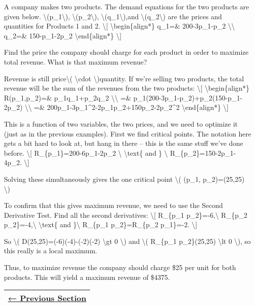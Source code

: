 A company makes two products. The demand equations for the two products
are given below. \textbackslash{}(p\_1\textbackslash{}),
\textbackslash{}(p\_2\textbackslash{}),
\textbackslash{}(q\_1\textbackslash{}),and
\textbackslash{}(q\_2\textbackslash{}) are the prices and quantities for
Products 1 and 2. \textbackslash{}{[} \textbackslash{}begin\{align*\}
q\_1=\& 200-3p\_1-p\_2 \textbackslash{}\textbackslash{} q\_2=\&
150-p\_1-2p\_2 \textbackslash{}end\{align*\} \textbackslash{}{]}

Find the price the company should charge for each product in order to
maximize total revenue. What is that maximum revenue?

Revenue is still price\textbackslash{}( \textbackslash{}cdot
\textbackslash{})quantity. If we're selling two products, the total
revenue will be the sum of the revenues from the two products:
\textbackslash{}{[} \textbackslash{}begin\{align*\} R(p\_1,p\_2)=\&
p\_1q\_1+p\_2q\_2 \textbackslash{}\textbackslash{} =\&
p\_1(200-3p\_1-p\_2)+p\_2(150-p\_1-2p\_2)
\textbackslash{}\textbackslash{} =\&
200p\_1-3p\_1\^{}2-2p\_1p\_2+150p\_2-2p\_2\^{}2
\textbackslash{}end\{align*\} \textbackslash{}{]}

This is a function of two variables, the two prices, and we need to
optimize it (just as in the previous examples). First we find critical
points. The notation here gets a bit hard to look at, but hang in there
-- this is the same stuff we've done before. \textbackslash{}{[}
R\_\{p\_1\}=200-6p\_1-2p\_2 \textbackslash{} \textbackslash{}text\{ and
\} \textbackslash{} R\_\{p\_2\}=150-2p\_1-4p\_2. \textbackslash{}{]}

Solving these simultaneously gives the one critical point
\textbackslash{}( (p\_1, p\_2)=(25,25) \textbackslash{})

To confirm that this gives maximum revenue, we need to use the Second
Derivative Test. Find all the second derivatives: \textbackslash{}{[}
R\_\{p\_1 p\_2\}=-6,\textbackslash{} R\_\{p\_2
p\_2\}=-4,\textbackslash{} \textbackslash{}text\{ and \}\textbackslash{}
R\_\{p\_1 p\_2\}=R\_\{p\_2 p\_1\}=-2. \textbackslash{}{]}

So \textbackslash{}( D(25,25)=(-6)(-4)-(-2)(-2) \textbackslash{}gt 0
\textbackslash{}) and \textbackslash{}( R\_\{p\_1 p\_2\}(25,25)
\textbackslash{}lt 0 \textbackslash{}), so this really is a local
maximum.

Thus, to maximize revenue the company should charge \$25 per unit for
both products. This will yield a maximum revenue of \$4375.

\begin{longtable}[]{@{}l@{}}
\toprule
\endhead
\href{section4-2.php}{← Previous Section}\tabularnewline
\bottomrule
\end{longtable}
